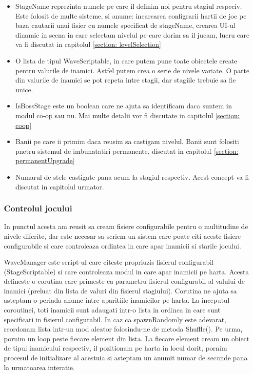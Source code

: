 \documentclass[12pt, a4paper]{article}
\begin{document}
	\begin{itemize}
		\item StageName reprezinta numele pe care il definim noi pentru stagiul respeciv. Este folosit de multe sisteme, si anume: incarcarea configrarii hartii de joc pe baza cautarii unui fisier cu numele specificat de stageName, crearea UI-ul dinamic in scena in care selectam nivelul pe care dorim sa il jucam, lucru care va fi discutat in capitolul \ref{section: levelSelection}
		\item O lista de tipul WaveScriptable, in care putem pune toate obiectele create pentru valurile de inamici. Astfel putem crea o serie de nivele variate. O parte din valurile de inamici se pot repeta intre stagii, dar stagiile trebuie sa fie unice.
		\item IsBossStage este un boolean care ne ajuta sa identificam daca suntem in modul co-op sau nu. Mai multe detalii vor fi discutate in capitolul \ref{section: coop} 
		\item Banii pe care ii primim daca reusim sa castigam nivelul. Banii sunt folositi pnetru sistemul de imbunatatiri permanente, discutat in capitolul \ref{section: permanentUpgrade}
		\item Numarul de stele castigate pana acum la stagiul respectiv. Acest concept va fi discutat in capitolul urmator.
	\end{itemize}
	
	
	
	
	
	\subsubsection{Controlul jocului}
	\label{section: gameState}
	
	In punctul acesta am reusit sa cream fisiere configurabile pentru o multitudine de nivele diferite, dar este necesar sa scriem un sistem care poate citi aceste fisiere configurabile si care controleaza ordintea in care apar inamicii si starile jocului.
	\newline
	
	WaveManager este script-ul care citeste propriuzis fisierul configurabil (StageScriptable) si care controleaza modul in care apar inamicii pe harta. Acesta defineste o corutina care primeste ca parametru fisierul configurabil al valului de inamici (preluat din lista de valuri din fisierul stagiului). Corutina ne ajuta sa asteptam o periada anume intre aparitiile inamicilor pe harta. La inceputul coroutinei, toti inamicii sunt adaugati intr-o lista in ordinea in care sunt specificati in fisierul configurabil. In caz ca spawnRandomly este adevarat, reordonam lista intr-un mod aleator folosindu-ne de metoda Shuffle(). Pe urma, pornim un loop peste fiecare element din lista. La fiecare element cream un obiect de tipul inamicului respectiv, il pozitionam pe harta in locul dorit, pornim procesul de initializare al acestuia si asteptam un anumit numar de secunde pana la urmatoarea interatie.
	\newline
	
\end{document}
